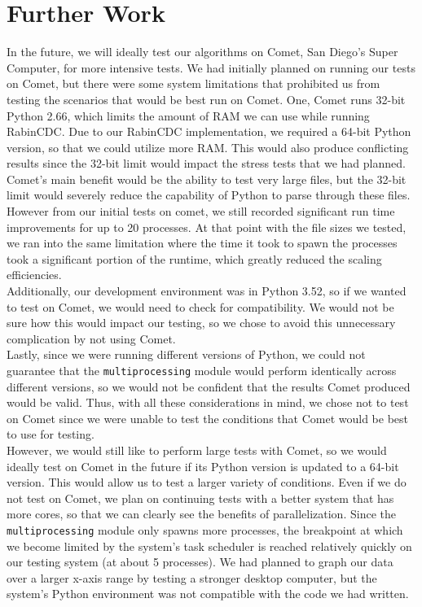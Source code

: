 \documentclass{acmtog} %
\begin{document}
	\section{Further Work}
	In the future, we will ideally test our algorithms on Comet, San Diego's Super Computer, for more intensive tests. We had initially planned on running our tests on Comet, but there were some system limitations that prohibited us from testing the scenarios that would be best run on Comet. One, Comet runs 32-bit Python 2.66, which limits the amount of RAM we can use while running RabinCDC. Due to our RabinCDC implementation, we required a 64-bit Python version, so that we could utilize more RAM. This would also produce conflicting results since the 32-bit limit would impact the stress tests that we had planned. Comet's main benefit would be the ability to test very large files, but the 32-bit limit would severely reduce the capability of Python to parse through these files. However from our initial tests on comet, we still recorded significant run time improvements for up to 20 processes. At that point with the file sizes we tested, we ran into the same limitation where the time it took to spawn the processes took a significant portion of the runtime, which greatly reduced the scaling efficiencies. \\
	
	Additionally, our development environment was in Python 3.52, so if we wanted to test on Comet, we would need to check for compatibility. We would not be sure how this would impact our testing, so we chose to avoid this unnecessary complication by not using Comet.\\
	
	Lastly, since we were running different versions of Python, we could not guarantee that the \texttt{multiprocessing} module would perform identically across different versions, so we would not be confident that the results Comet produced would be valid. Thus, with all these considerations in mind, we chose not to test on Comet since we were unable to test the conditions that Comet would be best to use for testing.\\
	
	However, we would still like to perform large tests with Comet, so we would ideally test on Comet in the future if its Python version is updated to a 64-bit version. This would allow us to test a larger variety of conditions. Even if we do not test on Comet, we plan on continuing tests with a better system that has more cores, so that we can clearly see the benefits of parallelization. Since the \texttt{multiprocessing} module only spawns more processes, the breakpoint at which we become limited by the system's task scheduler is reached relatively quickly on our testing system (at about 5 processes). We had planned to graph our data over a larger x-axis range by testing a stronger desktop computer, but the system's Python environment was not compatible with the code we had written. \\
	
\end{document}
